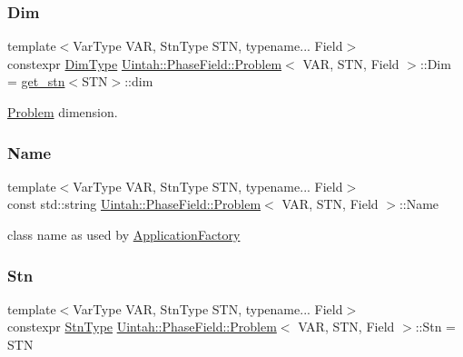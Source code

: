 \subsubsection{\texorpdfstring{Dim}{Dim}}
{\footnotesize\ttfamily template$<$Var\+Type V\+AR, Stn\+Type S\+TN, typename... Field$>$ \\
constexpr \hyperlink{namespaceUintah_1_1PhaseField_a12bfc68444894dffdf0cb8d9cf0cc76a}{Dim\+Type} \hyperlink{classUintah_1_1PhaseField_1_1Problem}{Uintah\+::\+Phase\+Field\+::\+Problem}$<$ V\+AR, S\+TN, Field $>$\+::Dim = \hyperlink{structUintah_1_1PhaseField_1_1get__stn}{get\+\_\+stn}$<$S\+TN$>$\+::dim\hspace{0.3cm}{\ttfamily [static]}}



\hyperlink{classUintah_1_1PhaseField_1_1Problem}{Problem} dimension. 

\mbox{\label{classUintah_1_1PhaseField_1_1Problem_a4573d4e59795aa206d47735ff1a57c85}} 
\subsubsection{\texorpdfstring{Name}{Name}}
{\footnotesize\ttfamily template$<$Var\+Type V\+AR, Stn\+Type S\+TN, typename... Field$>$ \\
const std\+::string \hyperlink{classUintah_1_1PhaseField_1_1Problem}{Uintah\+::\+Phase\+Field\+::\+Problem}$<$ V\+AR, S\+TN, Field $>$\+::Name\hspace{0.3cm}{\ttfamily [static]}}



class name as used by \hyperlink{classUintah_1_1PhaseField_1_1ApplicationFactory}{Application\+Factory} 

\mbox{\label{classUintah_1_1PhaseField_1_1Problem_a7f14e7e468084243304784fb9bba0202}} 
\subsubsection{\texorpdfstring{Stn}{Stn}}
{\footnotesize\ttfamily template$<$Var\+Type V\+AR, Stn\+Type S\+TN, typename... Field$>$ \\
constexpr \hyperlink{namespaceUintah_1_1PhaseField_a24d833a720598df1020f5cc2e75f8702}{Stn\+Type} \hyperlink{classUintah_1_1PhaseField_1_1Problem}{Uintah\+::\+Phase\+Field\+::\+Problem}$<$ V\+AR, S\+TN, Field $>$\+::Stn = S\+TN\hspace{0.3cm}{\ttfamily [static]}}



